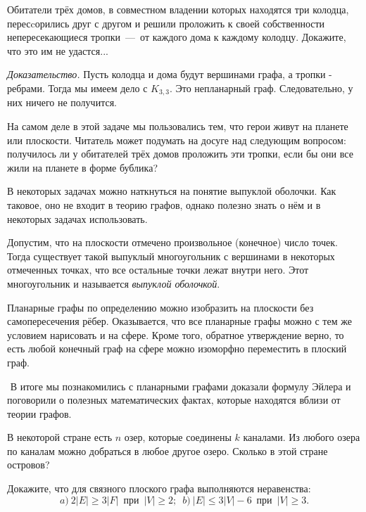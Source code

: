 \begin{example}
	Обитатели трёх домов, в совместном владении которых находятся три колодца, пересcорились друг с другом и решили проложить к своей собственности непересекающиеся тропки~---~от каждого дома к каждому колодцу. Докажите, что это им не удастся...
	
	\emph{Доказательство.} Пусть колодца и дома будут вершинами графа, а тропки - ребрами. Тогда мы имеем дело с $K_{3, 3}$. Это непланарный граф. Следовательно, у них ничего не получится.
\end{example}

	На самом деле в этой задаче мы пользовались тем, что герои живут на планете или плоскости. Читатель может подумать на досуге над следующим вопросом: получилось ли у обитателей трёх домов проложить эти тропки, если бы они все жили на планете в форме бублика?
	

	В некоторых задачах можно наткнуться на понятие выпуклой оболочки. Как таковое, оно не входит в теорию графов, однако полезно знать о нём и в некоторых задачах использовать.
	
	Допустим, что на плоскости отмечено произвольное (конечное) число точек. Тогда существует такой выпуклый многоугольник с вершинами в некоторых отмеченных точках, что все остальные точки лежат внутри него. Этот многоугольник и называется \emph{выпуклой оболочкой}.
	
	Планарные графы по определению можно изобразить на плоскости без самопересечения рёбер. Оказывается, что все планарные графы можно с тем же условием нарисовать и на сфере. Кроме того, обратное утверждение верно, то есть любой конечный граф на сфере можно изоморфно переместить в плоский граф.

$ $
\newline
	В итоге мы познакомились с планарными графами доказали формулу Эйлера и поговорили о полезных математических фактах, которые находятся вблизи от теории графов.
	

\begin{exersize}
	В некоторой стране есть $n$ озер, которые соединены $k$ каналами. Из любого озера по каналам можно добраться в любое другое озеро. Сколько в этой стране островов?
\end{exersize}

\begin{exersize}
	Докажите, что для связного плоского графа выполняются неравенства:
	$$a)\!\ 2|E| \geqslant 3|F| \;\ \text{при} \;\ |V| \geqslant 2; \;\ b) \!\ |E| \leqslant 3|V| - 6  \;\ \text{при}  \;\ |V| \geqslant 3.$$
\end{exersize}

